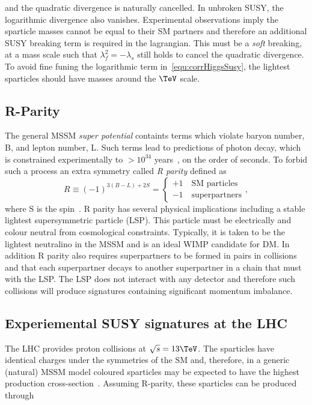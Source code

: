 and the quadratic divergence is naturally cancelled. In unbroken SUSY, the logarithmic divergence also vanishes. 
Experimental observations imply the sparticle masses cannot be equal to their SM partners and
therefore an additional SUSY breaking term is required in the lagrangian. This must be a \emph{soft} breaking,
at a mass scale such that $\lambda_f^2 = -\lambda_s$ still holds to cancel the quadratic divergence.
To avoid fine funing the logarithmic term in~\ref{equ:corrHiggsSusy}, the lightest sparticles should have 
masses around the $\TeV$ scale. 

\subsection{R-Parity}

The general MSSM \emph{super potential} containts terms which violate baryon number, B, and lepton number, 
L. Such terms lead to predictions of photon decay, which is constrained experimentally to $> 10^{34}$ years~\cite{protonDecay}, 
on the order of seconds. To forbid such a process an extra symmetry called \emph{R parity} defined as 
\begin{equation}
R \equiv (-1)^{3(B-L)+2S} = 
\begin{cases}
+ 1\quad \text{SM particles}\\
- 1\quad \text{superpartners}
\end{cases},
\end{equation}
where S is the spin~\cite{SUSYP}. R parity has several physical implications including a stable lightest supersymmetric 
particle (LSP). This particle must be electrically and colour neutral from cosmological constraints.
Typically, it is taken to be the lightest neutralino in the MSSM and is an ideal WIMP candidate for DM. 
In addition R parity also requires superpartners 
to be formed in pairs in collisions and that each superpartner decays to another superpartner
in a chain that must with the LSP. The LSP does not interact with any detector and therefore
such collisions will produce signatures containing significant momentum imbalance.

\subsection{Experiemental SUSY signatures at the LHC}

The LHC provides proton collisions at $\sqrt{s} = 13 \TeV$. The sparticles have identical charges under 
the symmetries of the SM and, therefore, in a generic (natural) MSSM model 
coloured sparticles may be expected to have the highest production 
cross-section~\cite{susyprod}. Assuming R-parity, these sparticles can be produced through


